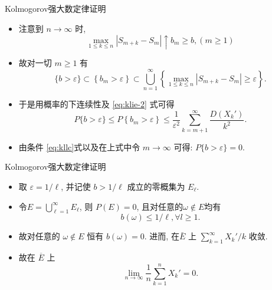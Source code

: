 \documentclass[Prob-All.tex]{subfiles}
\begin{document}
\begin{frame}{Kolmogorov强大数定律证明}
	\begin{itemize}[<+-|alert@+>]
		\item 注意到 ${n \rightarrow \infty}$ 时,
		\[
		\max _{1 \leq k \leq n}\left|S_{m+k}-S_{m}\right| \uparrow b_{m} \geq b, (m \geq 1)
		\]
		\item
		故对一切 $m \geq 1$ 有
		\[
		\{b>\varepsilon\} \subset\left\{b_{m}>\varepsilon\right\} \subset \bigcup_{n=1}^{\infty}\left\{\max _{1 \leq k \leq n}\left|S_{m+k}-S_{m}\right| \geq \varepsilon\right\} .
		\]

		\item 于是用概率的下连续性及 \eqref{eq:klie-2} 式可得
		\[
		P\{b>\varepsilon\} \leq P\left\{b_{m}>\varepsilon\right\} \leq \frac{1}{\varepsilon^{2}} \sum_{k=m+1}^{\infty} \frac{D\left(X_{k}'\right)}{k^{2}} .
		\]
		\item 由条件 \eqref{eq:kllc}式以及在上式中令 $m \rightarrow \infty$ 可得: ${P\{b>\varepsilon\}=0}$.



	\end{itemize}

	\end{frame}


\begin{frame}{Kolmogorov强大数定律证明}
	\begin{itemize}[<+-|alert@+>]

		\item 取 ${\varepsilon=1 / \ell}$, 并记使 ${b>1 / \ell}$ 成立的零概集为 $E_{\ell}$.
		\item 令$E=\bigcup_{\ell=1}^{\infty} E_{\ell}$, 则 ${P(E)=0}$, 且对任意的$\omega\notin E$均有
		\[{b(\omega) \leq 1 / \ell}, \forall l\geq 1.\]
		\item 故对任意的 $\omega \notin {E}$ 恒有 $b(\omega)=0$. 进而, 在${\bar{E}}$ 上 ${\sum_{k=1}^{\infty} X_{k}'/ k}$ 收敛.
		\item 故在 ${\overline{E}}$ 上
		\[{\lim _{n \rightarrow \infty} \dfrac{1}{n} \sum_{k=1}^{n} X_{k}'=0}.\]


	\end{itemize}

	\end{frame}
\end{document}
